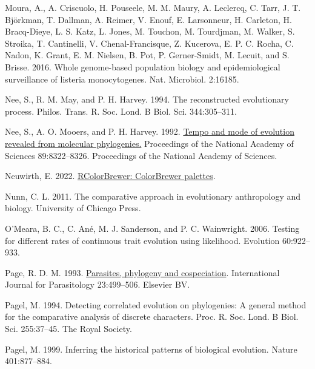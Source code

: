\documentclass[fleqn,10pt,lineno]{wlpeerj} %
\newlength{\cslhangindent}
\newlength{\cslentryspacingunit} %
\newenvironment{CSLReferences}[2] %
 {%
  \setlength{\parindent}{0pt}
  \ifodd #1
  \let\oldpar\par
  \def\par{\hangindent=\cslhangindent\oldpar}
  \fi
  \setlength{\parskip}{#2\cslentryspacingunit}
 }%
 {}
\begin{document}
\begin{CSLReferences}{1}{0}
\leavevmode{}%
Moura, A., A. Criscuolo, H. Pouseele, M. M. Maury, A. Leclercq, C. Tarr, J. T. Björkman, T. Dallman, A. Reimer, V. Enouf, E. Larsonneur, H. Carleton, H. Bracq-Dieye, L. S. Katz, L. Jones, M. Touchon, M. Tourdjman, M. Walker, S. Stroika, T. Cantinelli, V. Chenal-Francisque, Z. Kucerova, E. P. C. Rocha, C. Nadon, K. Grant, E. M. Nielsen, B. Pot, P. Gerner-Smidt, M. Lecuit, and S. Brisse. 2016. Whole genome-based population biology and epidemiological surveillance of listeria monocytogenes. Nat. Microbiol. 2:16185.

\leavevmode{}%
Nee, S., R. M. May, and P. H. Harvey. 1994. The reconstructed evolutionary process. Philos. Trans. R. Soc. Lond. B Biol. Sci. 344:305--311.

\leavevmode{}%
Nee, S., A. O. Mooers, and P. H. Harvey. 1992. \href{https://doi.org/10.1073/pnas.89.17.8322}{Tempo and mode of evolution revealed from molecular phylogenies.} Proceedings of the National Academy of Sciences 89:8322--8326. Proceedings of the National Academy of Sciences.

\leavevmode{}%
Neuwirth, E. 2022. \href{https://CRAN.R-project.org/package=RColorBrewer}{RColorBrewer: ColorBrewer palettes}.

\leavevmode{}%
Nunn, C. L. 2011. The comparative approach in evolutionary anthropology and biology. University of Chicago Press.

\leavevmode{}%
O'Meara, B. C., C. Ané, M. J. Sanderson, and P. C. Wainwright. 2006. Testing for different rates of continuous trait evolution using likelihood. Evolution 60:922--933.

\leavevmode{}%
Page, R. D. M. 1993. \href{https://doi.org/10.1016/0020-7519(93)90039-2}{Parasites, phylogeny and cospeciation}. International Journal for Parasitology 23:499--506. Elsevier {BV}.

\leavevmode{}%
Pagel, M. 1994. Detecting correlated evolution on phylogenies: A general method for the comparative analysis of discrete characters. Proc. R. Soc. Lond. B Biol. Sci. 255:37--45. The Royal Society.

\leavevmode{}%
Pagel, M. 1999. Inferring the historical patterns of biological evolution. Nature 401:877--884.


\end{CSLReferences}
\end{document}
